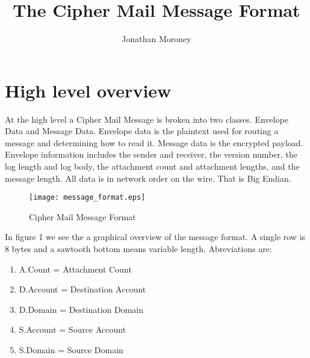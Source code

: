 \documentclass[a4paper,11pt]{article}
\title{The Cipher Mail Message Format}
\author{Jonathan Moroney}
\begin{document}
\maketitle
\tableofcontents


\section{High level overview}
At the high level a Cipher Mail Message is broken into two classes. Envelope Data and Message Data. Envelope data is the plaintext used for routing a message and determining how to read it. Message data is the encrypted payload. Envelope information includes the sender and receiver, the version number, the log length and log body, the attachment count and attachment lengths, and the message length. All data is in network order on the wire. That is Big Endian.
\begin{figure}[H]
\centering
\texttt{[image: message\_format.eps]}
\caption{Cipher Mail Message Format}
\end{figure}
In figure 1 we see the a graphical overview of the message format. A single row is 8 bytes and a sawtooth bottom means variable length. Abreviations are:
\begin{enumerate}
  \item A.Count = Attachment Count
  \item D.Account = Destination Account
  \item D.Domain = Destination Domain
  \item S.Account = Source Account
  \item S.Domain = Source Domain
\end{enumerate}
\end{document}
